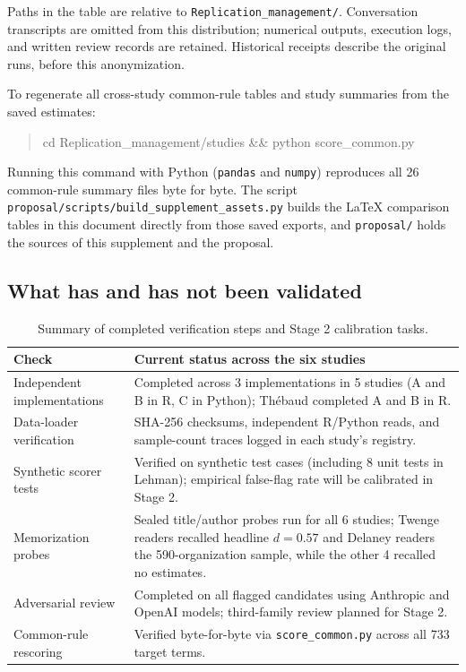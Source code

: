 \documentclass[11pt]{article}
\newcommand{\artifact}[1]{\nolinkurl{#1}}
\begin{document}
Paths in the table are relative to \artifact{Replication_management/}. Conversation transcripts are omitted from this distribution; numerical outputs, execution logs, and written review records are retained. Historical receipts describe the original runs, before this anonymization.\par
To regenerate all cross-study common-rule tables and study summaries from the saved estimates:
\begin{quote}\small\ttfamily
cd Replication\_management/studies \&\& python score\_common.py
\end{quote}
Running this command with Python (\texttt{pandas} and \texttt{numpy}) reproduces all 26 common-rule summary files byte for byte. The script \artifact{proposal/scripts/build_supplement_assets.py} builds the LaTeX comparison tables in this document directly from those saved exports, and \artifact{proposal/} holds the sources of this supplement and the proposal.

\subsection{What has and has not been validated}
\begin{table}[H]\centering\small
\begin{tabularx}{\linewidth}{@{}p{.27\linewidth}Y@{}}\toprule
Check & Current status across the six studies\\\midrule
Independent implementations & Completed across 3 implementations in 5 studies (A and B in R, C in Python); Th\'ebaud completed A and B in R.\\
Data-loader verification & SHA-256 checksums, independent R/Python reads, and sample-count traces logged in each study's registry.\\
Synthetic scorer tests & Verified on synthetic test cases (including 8 unit tests in Lehman); empirical false-flag rate will be calibrated in Stage 2.\\
Memorization probes & Sealed title/author probes run for all 6 studies; Twenge readers recalled headline $d=0.57$ and Delaney readers the 590-organization sample, while the other 4 recalled no estimates.\\
Adversarial review & Completed on all flagged candidates using Anthropic and OpenAI models; third-family review planned for Stage 2.\\
Common-rule rescoring & Verified byte-for-byte via \artifact{score_common.py} across all 733 target terms.\\\bottomrule
\end{tabularx}\caption{Summary of completed verification steps and Stage 2 calibration tasks.}\end{table}
\end{document}
